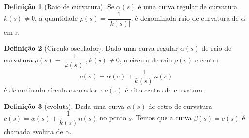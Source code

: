 \documentclass[12pt,leqno,twoside]{amsart}
\theoremstyle{definition}
\newtheorem{definicao}{Definição}[section]
\begin{document}
	\begin{definicao}[Raio de curvatura]
		Se $\alpha(s)$ é uma curva regular de curvatura $k(s)\neq 0$, a quantidade $\rho(s) = \dfrac{1}{| k(s)|}$. é denominada raio de curvatura de $\alpha$ em $s$.
	\end{definicao}
	\begin{definicao}[Círculo osculador]
		Dado uma curva regular $\alpha(s)$ de raio de curvatura $\rho(s) = \dfrac{1}{|k(s)|}, k(s) \neq 0 $, o círculo de raio $\rho(s)$ e centro $$c(s) = \alpha(s) + \dfrac{1}{k(s)} n(s)$$ é denominado círculo osculador e $c(s)$ é dito centro de curvatura.
	\end{definicao}
	\begin{definicao}[evoluta]
		Dada uma curva $\alpha(s)$ de cetro de curvatura $c(s) = \alpha(s) + \dfrac{1}{k(s)} n(s)$ no ponto $s$. Temos que a curva $\beta(s) = c(s)$ é chamada evoluta de $\alpha$.
	\end{definicao}
\end{document}
